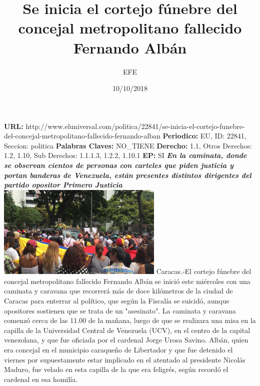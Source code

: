 \documentclass{article}%
\title{\textbf{Se inicia el cortejo fúnebre del concejal metropolitano fallecido Fernando Albán}}%
\author{EFE}%
\date{10/10/2018}%
\begin{document}
%
\normalsize%
\maketitle%
\textbf{URL: }%
http://www.eluniversal.com/politica/22841/se{-}inicia{-}el{-}cortejo{-}funebre{-}del{-}concejal{-}metropolitano{-}fallecido{-}fernando{-}alban\newline%
%
\textbf{Periodico: }%
EU, %
ID: %
22841, %
Seccion: %
politica\newline%
%
\textbf{Palabras Claves: }%
NO\_TIENE\newline%
%
\textbf{Derecho: }%
1.1, %
Otros Derechos: %
1.2, 1.10, %
Sub Derechos: %
1.1.1.3, 1.2.2, 1.10.1\newline%
%
\textbf{EP: }%
SI\newline%
\newline%
%
\textbf{\textit{En la caminata, donde se observan cientos de personas con carteles que piden justicia y portan banderas de Venezuela, están presentes distintos dirigentes del partido opositor Primero Justicia}}%
\newline%
\newline%
%
\includegraphics[width=300px]{253.jpg}%
\newline%
%
Caracas.{-}El cortejo fúnebre del concejal metropolitano fallecido Fernando Albán se inició este miércoles con una caminata y caravana que recorrerá más de doce kilómetros de la ciudad de Caracas para enterrar al político, que según la Fiscalía se suicidó, aunque opositores sostienen que se trata de un "asesinato".%
\newline%
%
La caminata y caravana comenzó cerca de las 11.00 de la mañana, luego de que se realizara una misa en la capilla de la Universidad Central de Venezuela (UCV), en el centro de la capital venezolana, y que fue oficiada por el cardenal Jorge Urosa Savino.%
\newline%
%
Albán, quien era concejal en el municipio caraqueño de Libertador y que fue detenido el viernes por supuestamente estar implicado en el atentado al presidente Nicolás Maduro, fue velado en esta capilla de la que era feligrés, según recordó el cardenal en esa homilía.%
\end{document}
